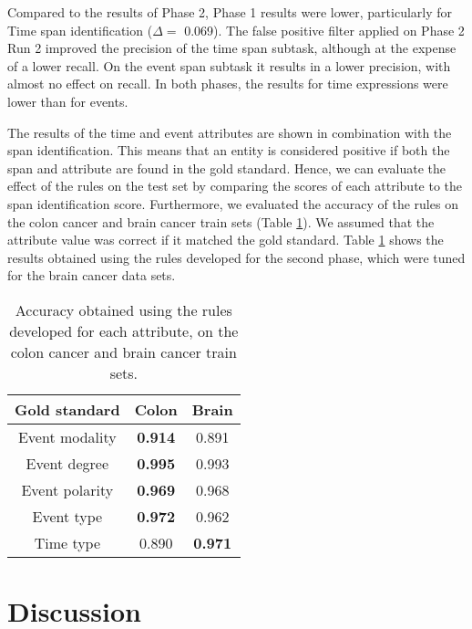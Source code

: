 \documentclass[11pt,a4paper]{article}
\begin{document}
Compared to the results of Phase 2, Phase 1 results were lower, particularly for Time span identification ($\Delta=$ 0.069).
The false positive filter applied on Phase 2 Run 2 improved the precision of the time span subtask, although at the expense of a lower recall.
On the event span subtask it results in a lower precision, with almost no effect on recall.
In both phases, the results for time expressions were lower than for events.

The results of the time and event attributes are shown in combination with the span identification.
This means that an entity is considered positive if both the span and attribute are found in the gold standard.
Hence, we can evaluate the effect of the rules on the test set by comparing the scores of each attribute to the span identification score.
Furthermore, we evaluated the accuracy of the rules on the colon cancer and brain cancer train sets (Table \ref{table:results4}).
We assumed that the attribute value was correct if it matched the gold standard.
Table \ref{table:results4} shows the results obtained using the rules developed for the second phase, which were tuned for the brain cancer data sets.


\begin{table}
\centering
\begin{tabular}{|c|cc|}
\hline
Gold standard & Colon & Brain\\ 
\hline
Event modality & \textbf{0.914} & 0.891\\ 
Event degree & \textbf{0.995} & 0.993\\ 
Event polarity & \textbf{0.969} & 0.968\\ 
Event type & \textbf{0.972} & 0.962\\ 
Time type & 0.890 & \textbf{0.971}\\ 
\hline\end{tabular}
\caption{Accuracy obtained using the rules developed for each attribute, on the colon cancer and brain cancer train sets.} 
\label{table:results4}
\end{table}

\section{Discussion}
\end{document}
